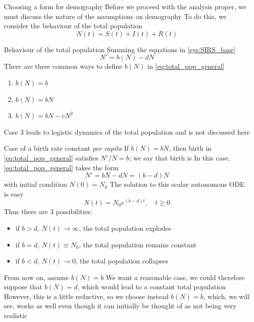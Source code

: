\documentclass[aspectratio=43]{beamer}
\begin{document}
\begin{frame}{Choosing a form for demography}
Before we proceed with the analysis proper, we must discuss the nature of the assumptions on demography
\vfill
To do this, we consider the behaviour of the total population 
\[
N(t)=S(t)+I(t)+R(t)
\]
\end{frame}

\begin{frame}{Behaviour of the total population}
Summing the equations in \eqref{sys:SIRS_base}
\begin{equation}\label{eq:total_pop_general}
N'=b(N)-dN
\end{equation}
\vfill
There are three common ways to define $b(N)$ in \eqref{eq:total_pop_general}
\begin{enumerate}
\item $b(N)=b$
\item $b(N)=bN$
\item $b(N)=bN-cN^2$
\end{enumerate}
\vfill
Case 3 leads to logistic dynamics of the total population and is not discussed here
\end{frame}


\begin{frame}{Case of a birth rate constant \emph{per capita}}
If $b(N)=bN$, then birth in \eqref{eq:total_pop_general} satisfies $N'/N=b$; we say that birth is 
\vfill
In this case, \eqref{eq:total_pop_general} takes the form
\[
N'=bN-dN=(b-d)N
\]
with initial condition $N(0)=N_0$
\vfill
The solution to this scalar autonomous ODE is easy
\[
N(t)=N_0e^{(b-d)t},\quad t\geq 0
\]
Thus there are 3 possibilities:
\begin{itemize}
  \item if $b>d$, $N(t)\to\infty$, the total population explodes 
  \item if $b=d$, $N(t)\equiv N_0$, the total population remains constant 
  \item if $b<d$, $N(t)\to 0$, the total population collapses
\end{itemize}
\end{frame}

\begin{frame}{From now on, assume $b(N)=b$}
\bbullet We want a reasonable case, we could therefore suppose that $b(N)=d$, which would lead to a constant total population
\vfill
\bbullet However, this is a little reductive, so we choose instead $b(N)=b$, which, we will see, works as well even though it can initially be thought of as not being very realistic
\end{frame}
\end{document}

